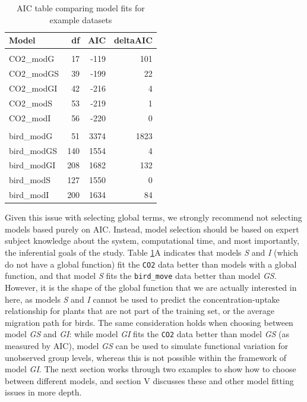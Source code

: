 \documentclass[12pt]{article}
\begin{document}
\begin{table}[t]

\caption{\label{tab:AIC_table_kable}AIC table comparing model fits for example datasets}
\centering
\begin{tabular}{lrrr}
\toprule
Model & df & AIC & deltaAIC\\
\midrule
\addlinespace[0.3em]
\multicolumn{4}{l}{\textbf{A. CO2 models}}\\
\hspace{1em}CO2\_modG & 17 & -119 & 101\\
\hspace{1em}CO2\_modGS & 39 & -199 & 22\\
\hspace{1em}CO2\_modGI & 42 & -216 & 4\\
\hspace{1em}CO2\_modS & 53 & -219 & 1\\
\hspace{1em}CO2\_modI & 56 & -220 & 0\\
\addlinespace[0.3em]
\multicolumn{4}{l}{\textbf{B. bird\_move models}}\\
\hspace{1em}bird\_modG & 51 & 3374 & 1823\\
\hspace{1em}bird\_modGS & 140 & 1554 & 4\\
\hspace{1em}bird\_modGI & 208 & 1682 & 132\\
\hspace{1em}bird\_modS & 127 & 1550 & 0\\
\hspace{1em}bird\_modI & 200 & 1634 & 84\\
\bottomrule
\end{tabular}
\end{table}

Given this issue with selecting global terms, we strongly recommend not
selecting models based purely on AIC. Instead, model selection should be
based on expert subject knowledge about the system, computational time,
and most importantly, the inferential goals of the study. Table
\ref{tab:AIC_table_kable}A indicates that models \emph{S} and \emph{I}
(which do not have a global function) fit the \texttt{CO2} data better
than models with a global function, and that model \emph{S} fits the
\texttt{bird\_move} data better than model \emph{GS}. However, it is the
shape of the global function that we are actually interested in here, as
models \emph{S} and \emph{I} cannot be used to predict the
concentration-uptake relationship for plants that are not part of the
training set, or the average migration path for birds. The same
consideration holds when choosing between model \emph{GS} and \emph{GI}:
while model \emph{GI} fits the \texttt{CO2} data better than model
\emph{GS} (as measured by AIC), model \emph{GS} can be used to simulate
functional variation for unobserved group levels, whereas this is not
possible within the framework of model \emph{GI}. The next section works
through two examples to show how to choose between different models, and
section V discusses these and other model fitting issues in more depth.
\end{document}
